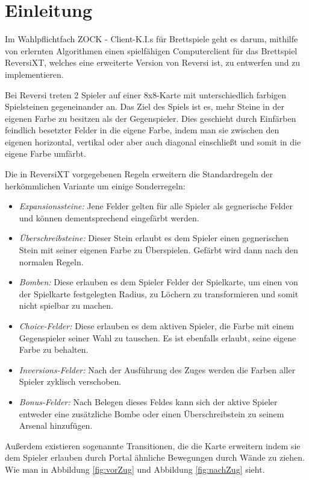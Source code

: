 \documentclass[12pt,a4paper,bibliography=totocnumbered,listof=totocnumbered,ngerman]{scrartcl}
\begin{document}
\section{Einleitung}

Im Wahlpflichtfach ZOCK - Client-K.I.s für Brettspiele geht es darum, mithilfe von erlernten Algorithmen einen spielfähigen Computerclient für das Brettspiel ReversiXT, welches eine erweiterte Version von Reversi ist, zu entwerfen und zu implementieren.

Bei Reversi treten 2 Spieler auf einer 8x8-Karte mit unterschiedlich farbigen Spielsteinen gegeneinander an. Das Ziel des Spiels ist es, mehr Steine in der eigenen Farbe zu besitzen als der Gegenspieler. Dies geschieht durch Einfärben feindlich besetzter Felder in die eigene Farbe, indem man sie zwischen den eigenen horizontal, vertikal oder aber auch diagonal einschließt und somit in die eigene Farbe umfärbt.

Die in ReversiXT vorgegebenen Regeln erweitern die Standardregeln der herkömmlichen Variante um einige Sonderregeln:

\begin{itemize}
\item \emph{Expansionssteine:} Jene Felder gelten für alle Spieler als gegnerische Felder und können dementsprechend eingefärbt werden.
\item \emph{Überschreibsteine:} Dieser Stein erlaubt es dem Spieler einen gegnerischen Stein mit seiner eigenen Farbe zu Überspielen. Gefärbt wird dann nach den normalen Regeln.
\item \emph{Bomben:} Diese erlauben es dem Spieler Felder der Spielkarte, um einen von der Spielkarte festgelegten Radius, zu Löchern zu transformieren und somit nicht spielbar zu machen.
\item \emph {Choice-Felder:} Diese erlauben es dem aktiven Spieler, die Farbe mit einem Gegenspieler seiner Wahl zu tauschen. Es ist ebenfalls erlaubt, seine eigene Farbe zu behalten.
\item \emph {Inversions-Felder:} Nach der Ausführung des Zuges werden die Farben aller Spieler zyklisch verschoben.
\item \emph{Bonus-Felder:} Nach Belegen dieses Feldes kann sich der aktive Spieler entweder eine zusätzliche Bombe oder einen Überschreibstein zu seinem Arsenal hinzufügen. 
\end{itemize}

Außerdem existieren sogenannte \glqq{}Transitionen\grqq{}, die die Karte erweitern indem sie dem Spieler erlauben durch Portal ähnliche Bewegungen durch Wände zu ziehen. Wie man in Abbildung \ref{fig:vorZug} und Abbildung \ref{fig:nachZug} sieht.\\
\end{document}
